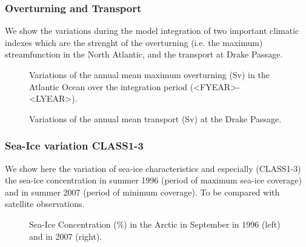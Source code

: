 \documentclass[12pt]{article}
\begin{document}
\subsubsection{Overturning and Transport}

We show the variations during the model integration of two important climatic indexes which are the strenght of the overturning (i.e. the maximum) streamfunction in the North Atlantic, and the transport at Drake Passage.

\begin{figure}[H]
\begin{center}
\caption{Variations of the annual mean maximum overturning (Sv) in the Atlantic Ocean over the integration period (<FYEAR>-<LYEAR>).}
\end{center}
\end{figure}

\begin{figure}[H]
\begin{center}
\caption{Variations of the annual mean transport (Sv) at the Drake Passage.}
\end{center}
\end{figure}

\subsubsection{Sea-Ice variation CLASS1-3}

We show here the variation of sea-ice characteristics and especially (CLASS1-3) the sea-ice concentration in summer 1996 (period of maximum sea-ice coverage) and in summer 2007 (period of minimum coverage). To be compared with satellite observations.

\begin{figure}[H]
\begin{center}
\begin{minipage}{0.47\linewidth}
\end{minipage}
\hfill
\begin{minipage}{0.47\linewidth}
\end{minipage}
\caption{Sea-Ice Concentration (\%) in the Arctic in September in 1996 (left) and in 2007 (right).}
\end{center}
\end{figure}
\end{document}
